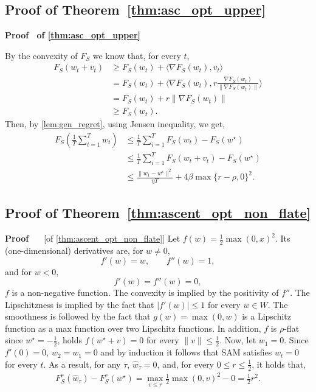 \documentclass[11pt]{article}
\newcommand{\fsmax}{F_S^{\rad}}
\newcommand{\rad}{r}
\renewenvironment{proof}[1][]{%
  \par\noindent\textbf{\upshape Proof%
  \if\relax\detokenize{#1}\relax\else\ #1\fi}\ %
}{\jmlrQED}
\begin{document}
\subsection{Proof of Theorem~\ref{thm:asc_opt_upper}}\label{proof_asc_opt_upper}
 \begin{proof}[of \cref{thm:asc_opt_upper}]
    By the convexity of $F_S$ we know that, for every $t$,
    \begin{align*}
        F_S(w_t+v_t)&\geq F_S(w_t) + \langle\nabla F_S(w_t),v_t\rangle
        \\&= F_S(w_t) + \langle\nabla F_S(w_t),\rad\frac{\nabla F_S (w_t)}{\|\nabla F_S(w_t)\|}\rangle
         \\&= F_S(w_t) + \rad \|\nabla F_S(w_t)\|
        \\&\geq F_S(w_t).
    \end{align*}
    Then, by \cref{lem:gen_regret}, using Jensen inequality, we get,
\begin{align*}
F_S\left(\frac{1}{T}\sum_{t=1}^T w_t\right)
    &\leq \frac{1}{T}\sum_{i=1}^T F_S\left( w_t\right)-F_S(w^\star)
    \\&\leq 
    \frac{1}{T}\sum_{i=1}^T F_S\left( w_t+v_t\right)-F_S(w^\star)
    \\&\leq 
    \frac{\|w_1-w^\star\|^2}{\eta T} + 4\beta\max\{\rad - \rho, 0\}^2.
\end{align*}
\end{proof}




\subsection{Proof of Theorem~\ref{thm:ascent_opt_non_flate}}\label{sec:ascent_opt_non_flate}

\begin{proof} [of \cref{thm:ascent_opt_non_flate}]
Let $f(w)=\frac{1}{2}\max(0,x)^2$.
Its (one-dimensional) derivatives are, for $w\neq 0$,
\[
f'(w)=w,\qquad f''(w)=1,
\]
and for $w<0$, \[
f'(w)=f''(w)=0,
\]
$f$ is a non-negative function.
The convexity is implied by the positivity of $f''$. 
The Lipschitzness is implied by the fact that $|f'(w)|\leq 1$ for every $w\in W$. The smoothness is followed by the fact that $g(w)=\max (0,w)$ is a Lipschitz function as a max function over two Lipschitz functions.
In addition, $f$ is $\rho$-flat 
since $w^\star=-\frac{1}{2}$, holds $f(w^\star +v) =0$ for every $\|v\|\leq \frac{1}{2}$.
Now, let $w_1=0$.
Since $f'(0)=0$, $w_2=w_1=0$ and by induction it follows that SAM satisfies $w_t=0$ for every $t$.
As a result, for any $\tau$, $\widehat{w}_{\tau}=0$,
and, for every $0\leq \rad\leq \frac{1}{2}$, it holds that,
\begin{align*}
    \fsmax(\widehat{w}_{\tau})-\fsmax(w^\star)=\max_{v\leq \rad} \frac{1}{2}\max(0,v)^2-0=\frac{1}{2}\rad^2.
\end{align*}
\end{proof}
\end{document}
